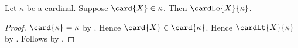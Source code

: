\begin{proposition}\label{card_belongs_to_cardinal_implies_cardinal_le}
    Let $\kappa$ be a cardinal.
    Suppose $\card{X}\in\kappa$.
    Then $\cardLe{X}{\kappa}$.
\end{proposition}
\begin{proof}
    $\card{\kappa}=\kappa$ by .
    Hence $\card{X}\in\card{\kappa}$.
    Hence $\cardLt{X}{\kappa}$ by .
    Follows by .
\end{proof}
